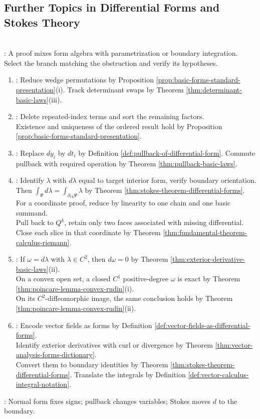 \subsection{Further Topics in Differential Forms and Stokes Theory}

\begin{proofmethod} \label{meth:differential-forms-proof-patterns} \\
: A proof mixes form algebra with parametrization or boundary integration.\\
Select the branch matching the obstruction and verify its hypotheses.
\begin{enumerate}[label=(\roman*)]
\setlength{\itemsep}{0pt}
\item {}: Reduce wedge permutations by Proposition \ref{prop:basic-forms-standard-presentation}(i). Track determinant swaps by Theorem \ref{thm:determinant-basic-laws}(iii).
\item {}: Delete repeated-index terms and sort the remaining factors.\\
Existence and uniqueness of the ordered result hold by Proposition \ref{prop:basic-forms-standard-presentation}.
\item {}: Replace $dy_i$ by $dt_i$ by Definition \ref{def:pullback-of-differential-form}. Commute pullback with required operation by Theorem \ref{thm:pullback-basic-laws}.
\item {}: Identify $\lambda$ with $d\lambda$ equal to target interior form,  verify boundary orientation. Then $\int_\Psi d\lambda=\int_{\partial_{\mathrm{ch}}\Psi}\lambda$ by Theorem \ref{thm:stokes-theorem-differential-forms}.\\
For a coordinate proof, reduce by linearity to one chain and one basic summand.\\
Pull back to $Q^k$, retain only two faces associated with missing differential. Close each slice in that coordinate by Theorem \ref{thm:fundamental-theorem-calculus-riemann}.
\item {}: If $\omega=d\lambda$ with $\lambda\in C^2$, then $d\omega=0$ by Theorem \ref{thm:exterior-derivative-basic-laws}(ii).\\
On a convex open set, a closed $C^1$ positive-degree $\omega$ is exact by Theorem \ref{thm:poincare-lemma-convex-rudin}(i).\\
On its $C^2$-diffeomorphic image, the same conclusion holds by Theorem \ref{thm:poincare-lemma-convex-rudin}(ii).
\item {}: Encode vector fields as forms by Definition \ref{def:vector-fields-as-differential-forms}.\\
Identify exterior derivatives with curl or divergence by Theorem \ref{thm:vector-analysis-forms-dictionary}.\\
Convert them to boundary identities by Theorem \ref{thm:stokes-theorem-differential-forms}. Translate the integrals by Definition \ref{def:vector-calculus-integral-notation}.
\end{enumerate}
: Normal form fixes signs; pullback changes variables; Stokes moves $d$ to the boundary.
\end{proofmethod}
